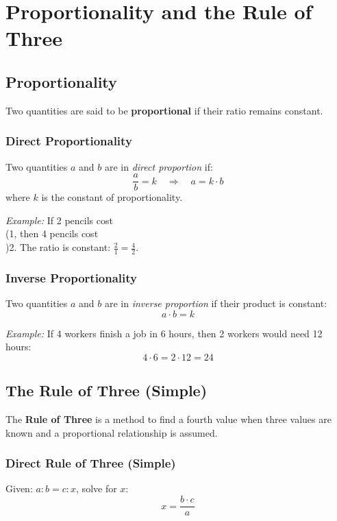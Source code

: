 \section{Proportionality and the Rule of Three}

\subsection{Proportionality}

Two quantities are said to be \textbf{proportional} if their ratio remains constant.

\subsubsection*{Direct Proportionality}

Two quantities \(a\) and \(b\) are in \textit{direct proportion} if:
\[
\frac{a}{b} = k \quad \Rightarrow \quad a = k \cdot b
\]
where \(k\) is the constant of proportionality.

\textit{Example:} If 2 pencils cost \\(1, then 4 pencils cost \\)2. The ratio is constant: \(\frac{2}{1} = \frac{4}{2}\).

\subsubsection*{Inverse Proportionality}

Two quantities \(a\) and \(b\) are in \textit{inverse proportion} if their product is constant:
\[
a \cdot b = k
\]

\textit{Example:} If 4 workers finish a job in 6 hours, then 2 workers would need 12 hours:
\[
4 \cdot 6 = 2 \cdot 12 = 24
\]

\subsection{The Rule of Three (Simple)}

The \textbf{Rule of Three} is a method to find a fourth value when three values are known and a proportional relationship is assumed.

\subsubsection*{Direct Rule of Three (Simple)}

Given: \(a : b = c : x\), solve for \(x\):
\[
x = \frac{b \cdot c}{a}
\]

